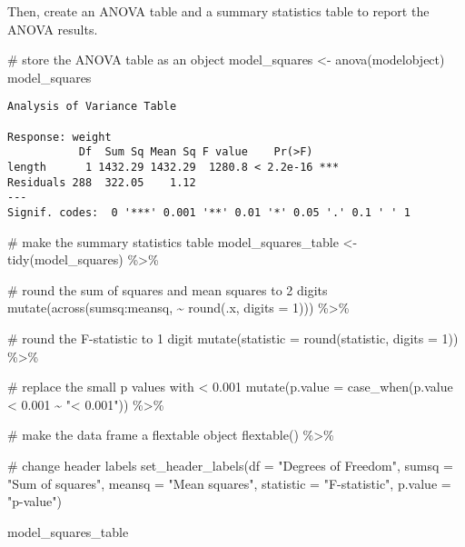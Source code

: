 \documentclass[
  letterpaper,
  DIV=11,
  numbers=noendperiod]{scrartcl}
\newenvironment{Shaded}{\begin{snugshade}}{\end{snugshade}}
\newcommand{\AttributeTok}[1]{\textcolor[rgb]{0.40,0.45,0.13}{#1}}
\newcommand{\CommentTok}[1]{\textcolor[rgb]{0.37,0.37,0.37}{#1}}
\newcommand{\DecValTok}[1]{\textcolor[rgb]{0.68,0.00,0.00}{#1}}
\newcommand{\FloatTok}[1]{\textcolor[rgb]{0.68,0.00,0.00}{#1}}
\newcommand{\FunctionTok}[1]{\textcolor[rgb]{0.28,0.35,0.67}{#1}}
\newcommand{\NormalTok}[1]{\textcolor[rgb]{0.00,0.23,0.31}{#1}}
\newcommand{\OtherTok}[1]{\textcolor[rgb]{0.00,0.23,0.31}{#1}}
\newcommand{\SpecialCharTok}[1]{\textcolor[rgb]{0.37,0.37,0.37}{#1}}
\newcommand{\StringTok}[1]{\textcolor[rgb]{0.13,0.47,0.30}{#1}}
\begin{document}
Then, create an ANOVA table and a summary statistics table to report the
ANOVA results.

\begin{Shaded}
\begin{Highlighting}[]
\CommentTok{\# store the ANOVA table as an object}
\NormalTok{model\_squares }\OtherTok{\textless{}{-}} \FunctionTok{anova}\NormalTok{(modelobject)}
\NormalTok{model\_squares}
\end{Highlighting}
\end{Shaded}

\begin{verbatim}
Analysis of Variance Table

Response: weight
           Df  Sum Sq Mean Sq F value    Pr(>F)    
length      1 1432.29 1432.29  1280.8 < 2.2e-16 ***
Residuals 288  322.05    1.12                      
---
Signif. codes:  0 '***' 0.001 '**' 0.01 '*' 0.05 '.' 0.1 ' ' 1
\end{verbatim}

\begin{Shaded}
\begin{Highlighting}[]
\CommentTok{\# make the summary statistics table}
\NormalTok{model\_squares\_table }\OtherTok{\textless{}{-}} \FunctionTok{tidy}\NormalTok{(model\_squares) }\SpecialCharTok{\%\textgreater{}\%} 
  
  \CommentTok{\# round the sum of squares and mean squares to 2 digits}
  \FunctionTok{mutate}\NormalTok{(}\FunctionTok{across}\NormalTok{(sumsq}\SpecialCharTok{:}\NormalTok{meansq, }\SpecialCharTok{\textasciitilde{}} \FunctionTok{round}\NormalTok{(.x, }\AttributeTok{digits =} \DecValTok{1}\NormalTok{))) }\SpecialCharTok{\%\textgreater{}\%} 
  
  \CommentTok{\# round the F{-}statistic to 1 digit}
  \FunctionTok{mutate}\NormalTok{(}\AttributeTok{statistic =} \FunctionTok{round}\NormalTok{(statistic, }\AttributeTok{digits =} \DecValTok{1}\NormalTok{)) }\SpecialCharTok{\%\textgreater{}\%} 
  
  \CommentTok{\# replace the small p values with \textless{} 0.001}
  \FunctionTok{mutate}\NormalTok{(}\AttributeTok{p.value =} \FunctionTok{case\_when}\NormalTok{(p.value }\SpecialCharTok{\textless{}} \FloatTok{0.001} \SpecialCharTok{\textasciitilde{}} \StringTok{"\textless{} 0.001"}\NormalTok{)) }\SpecialCharTok{\%\textgreater{}\%} 
  
  \CommentTok{\# make the data frame a flextable object}
  \FunctionTok{flextable}\NormalTok{() }\SpecialCharTok{\%\textgreater{}\%} 
  
  \CommentTok{\# change header labels}
  \FunctionTok{set\_header\_labels}\NormalTok{(}\AttributeTok{df =} \StringTok{"Degrees of Freedom"}\NormalTok{, }
                    \AttributeTok{sumsq =} \StringTok{"Sum of squares"}\NormalTok{,}
                    \AttributeTok{meansq =} \StringTok{"Mean squares"}\NormalTok{,}
                    \AttributeTok{statistic =} \StringTok{"F{-}statistic"}\NormalTok{,}
                    \AttributeTok{p.value =} \StringTok{"p{-}value"}\NormalTok{)}
  
\NormalTok{model\_squares\_table}
\end{Highlighting}
\end{Shaded}
\end{document}
